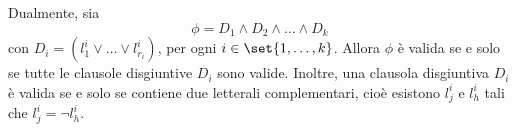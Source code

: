 Dualmente, sia
\[\phi = D_1 \land D_2 \land \ldots \land D_k\]
con \(D_i = (l_1^i \lor \ldots \lor l_{r_i}^i)\), per ogni \(i \in \set{1,\ldots,k}\).
Allora \(\phi\) è valida se e solo se tutte le clausole disgiuntive \(D_i\) sono valide.
Inoltre, una clausola disgiuntiva \(D_i\) è valida se e solo se contiene due letterali complementari, cioè esistono \(l_j^i\) e \(l_h^i\) tali che \(l_j^i = \neg l_h^i\).
